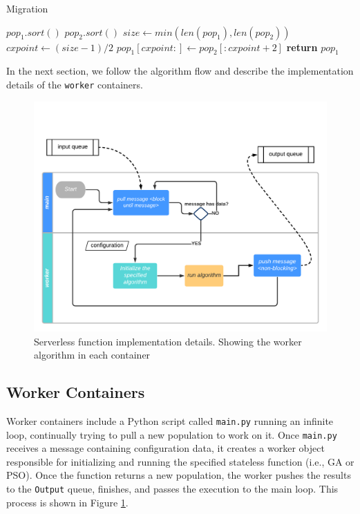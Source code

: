 \documentclass[review]{elsarticle}
\begin{document}
\begin{algorithm}
    \caption{Migration}
    \label{alg:migration}
    \begin{algorithmic}[1]
            \State $pop_1.sort()$
            \State $pop_2.sort()$
            \State $size\gets min(len(pop_1), len(pop_2))$
            \State $cxpoint\gets (size-1)/2$
            \State $pop_1[cxpoint:]\gets pop_2[:cxpoint+2]$
            \State \textbf{return} $pop_1$
        \EndProcedure 
    \end{algorithmic}
\end{algorithm}



In the next section, we follow the algorithm flow and describe the 
implementation details of the \texttt{worker} containers. 

\begin{figure}[ht]
    \centering
    \includegraphics[width=\textwidth]{worker}
    \caption{Serverless function implementation details. Showing the worker algorithm in each container}
    \label{fig:worker}
\end{figure}

\subsection{Worker Containers} 
\label{workers}

Worker containers include a Python script called \texttt{main.py} running an
infinite loop, continually trying to pull a new population to work on it. Once
\texttt{main.py} receives a message containing configuration data, it creates a
worker object responsible for initializing and running the specified stateless
function (i.e., GA or PSO). Once the function returns a new population, the
worker pushes the results to the \texttt{Output} queue, finishes, and passes
the execution to the main loop. This process is shown in Figure
\ref{fig:worker}.
\end{document}
